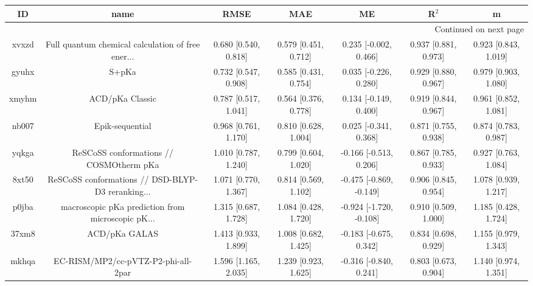 \documentclass{article}
\begin{document}
\begin{center}
\begin{longtable}{|ccccccc|}
\toprule
    ID &                                               name &                  RMSE &                   MAE &                       ME &                 R$^2$ &                      m \\
\midrule
\endhead
\midrule
\multicolumn{7}{r}{{Continued on next page}} \\
\midrule
\endfoot

\bottomrule
\endlastfoot
 xvxzd &  Full quantum chemical calculation of free ener... &  0.680 [0.540, 0.818] &  0.579 [0.451, 0.712] &    0.235 [-0.002, 0.466] &  0.937 [0.881, 0.973] &   0.923 [0.843, 1.019] \\
 gyuhx &                                              S+pKa &  0.732 [0.547, 0.908] &  0.585 [0.431, 0.754] &    0.035 [-0.226, 0.280] &  0.929 [0.880, 0.967] &   0.979 [0.903, 1.080] \\
 xmyhm &                                    ACD/pKa Classic &  0.787 [0.517, 1.041] &  0.564 [0.376, 0.778] &    0.134 [-0.149, 0.400] &  0.919 [0.844, 0.967] &   0.961 [0.852, 1.081] \\
 nb007 &                                    Epik-sequential &  0.968 [0.761, 1.170] &  0.810 [0.628, 1.004] &    0.025 [-0.341, 0.368] &  0.871 [0.755, 0.938] &   0.874 [0.783, 0.987] \\
 yqkga &            ReSCoSS conformations // COSMOtherm pKa &  1.010 [0.787, 1.240] &  0.799 [0.604, 1.020] &   -0.166 [-0.513, 0.206] &  0.867 [0.785, 0.933] &   0.927 [0.763, 1.084] \\
 8xt50 &  ReSCoSS conformations // DSD-BLYP-D3 reranking... &  1.071 [0.770, 1.367] &  0.814 [0.569, 1.102] &  -0.475 [-0.869, -0.149] &  0.906 [0.845, 0.954] &   1.078 [0.939, 1.217] \\
 p0jba &  macroscopic pKa prediction from microscopic pK... &  1.315 [0.687, 1.728] &  1.084 [0.428, 1.720] &  -0.924 [-1.720, -0.108] &  0.910 [0.509, 1.000] &   1.185 [0.428, 1.724] \\
 37xm8 &                                      ACD/pKa GALAS &  1.413 [0.933, 1.899] &  1.008 [0.682, 1.425] &   -0.183 [-0.675, 0.342] &  0.834 [0.698, 0.929] &   1.155 [0.979, 1.343] \\
 mkhqa &                EC-RISM/MP2/cc-pVTZ-P2-phi-all-2par &  1.596 [1.165, 2.035] &  1.239 [0.923, 1.625] &   -0.316 [-0.840, 0.241] &  0.803 [0.673, 0.904] &   1.140 [0.974, 1.351] \\

\end{longtable}
\end{center}
\end{document}
